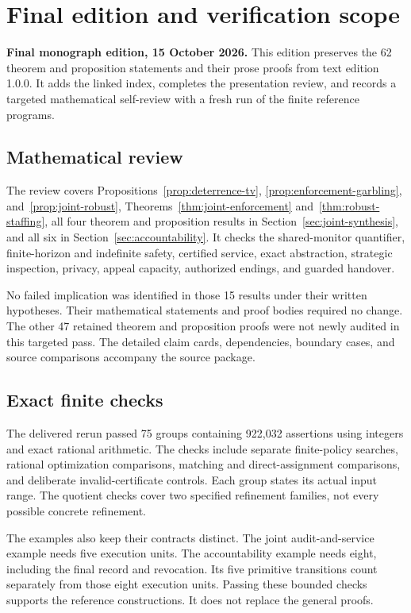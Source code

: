 \clearpage
\section{Final edition and verification scope}\label{app:release-review}
\noindent\textbf{Final monograph edition, 15 October 2026.} This edition preserves the 62 theorem and proposition statements and their prose proofs from text edition 1.0.0. It adds the linked index, completes the presentation review, and records a targeted mathematical self-review with a fresh run of the finite reference programs.

\subsection*{Mathematical review}
The review covers Propositions~\ref{prop:deterrence-tv}, \ref{prop:enforcement-garbling}, and~\ref{prop:joint-robust}, Theorems~\ref{thm:joint-enforcement} and~\ref{thm:robust-staffing}, all four theorem and proposition results in Section~\ref{sec:joint-synthesis}, and all six in Section~\ref{sec:accountability}. It checks the shared-monitor quantifier, finite-horizon and indefinite safety, certified service, exact abstraction, strategic inspection, privacy, appeal capacity, authorized endings, and guarded handover.

No failed implication was identified in those 15 results under their written hypotheses. Their mathematical statements and proof bodies required no change. The other 47 retained theorem and proposition proofs were not newly audited in this targeted pass. The detailed claim cards, dependencies, boundary cases, and source comparisons accompany the source package.

\subsection*{Exact finite checks}
The delivered rerun passed 75 groups containing 922,032 assertions using integers and exact rational arithmetic. The checks include separate finite-policy searches, rational optimization comparisons, matching and direct-assignment comparisons, and deliberate invalid-certificate controls. Each group states its actual input range. The quotient checks cover two specified refinement families, not every possible concrete refinement.

The examples also keep their contracts distinct. The joint audit-and-service example needs five execution units. The accountability example needs eight, including the final record and revocation. Its five primitive transitions count separately from those eight execution units. Passing these bounded checks supports the reference constructions. It does not replace the general proofs.

